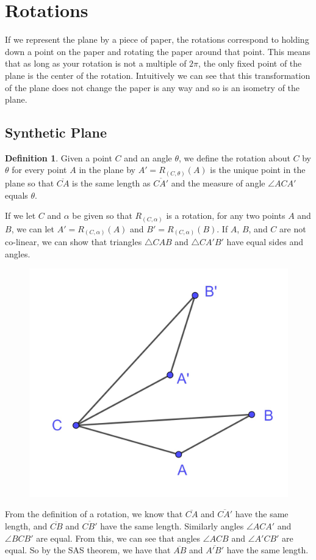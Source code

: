 \documentclass[
]{book}
\let\stdsection\section
\renewcommand\section{\newpage\stdsection}
\theoremstyle{definition}
\newtheorem{definition}{Definition}[chapter]
\theoremstyle{definition}
\theoremstyle{definition}
\theoremstyle{definition}
\theoremstyle{remark}
\begin{document}
\hypertarget{rotations}{%
\section{Rotations}\label{rotations}}

If we represent the plane by a piece of paper, the rotations correspond to holding down a point on the paper and rotating the paper around that point. This means that as long as your rotation is not a multiple of \(2\pi\), the only fixed point of the plane is the center of the rotation. Intuitively we can see that this transformation of the plane does not change the paper is any way and so is an isometry of the plane.

\hypertarget{synthetic-plane-2}{%
\subsection{Synthetic Plane}\label{synthetic-plane-2}}

\begin{definition}
Given a point \(C\) and an angle \(\theta\), we define the rotation about \(C\) by \(\theta\) for every point \(A\) in the plane by \(A'=R_{(C,\theta)}(A)\) is the unique point in the plane so that \(\overline{CA}\) is the same length as \(\overline{CA'}\) and the measure of angle \(\angle ACA'\) equals \(\theta\).
\end{definition}

If we let \(C\) and \(\alpha\) be given so that \(R_{(C,\alpha)}\) is a rotation, for any two points \(A\) and \(B\), we can let \(A'=R_{(C,\alpha)}(A)\) and \(B'=R_{(C,\alpha)}(B)\). If \(A\), \(B\), and \(C\) are not co-linear, we can show that triangles \(\triangle CAB\) and \(\triangle CA'B'\) have equal sides and angles.

\begin{figure}

{\centering \includegraphics[width=0.3\linewidth]{images/Rotation_synthetic} 

}

\end{figure}

From the definition of a rotation, we know that \(\overline{CA}\) and \(\overline{CA'}\) have the same length, and \(\overline{CB}\) and \(\overline{CB'}\) have the same length. Similarly angles \(\angle ACA'\) and \(\angle BCB'\) are equal. From this, we can see that angles \(\angle ACB\) and \(\angle A'CB'\) are equal. So by the SAS theorem, we have that \(\overline{AB}\) and \(\overline{A'B'}\) have the same length.
\end{document}
